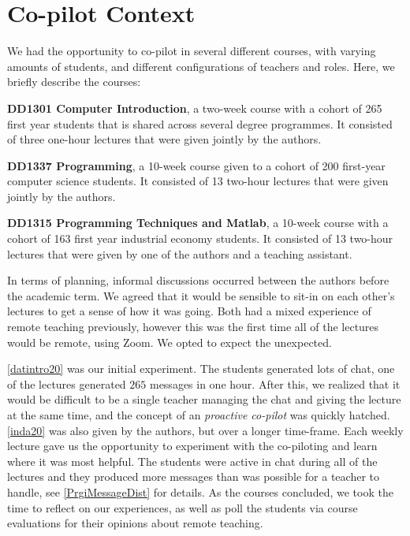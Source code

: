 \documentclass[sigconf,natbib=false]{acmart}
\begin{document}
\section{Co-pilot Context}
We had the opportunity to co-pilot in several different courses, with varying amounts of students, and different configurations of teachers and roles. Here, we briefly describe the courses:

\begin{courses}
  \item\label{datintro20} \textbf{DD1301 Computer Introduction}, a two-week course with a cohort of 265 first year students that is shared across several degree programmes. It consisted of three one-hour lectures that were given jointly by the authors.

  \item\label{inda20} \textbf{DD1337 Programming}, a 10-week course given to a cohort of 200 first-year computer science students. It consisted of 13 two-hour lectures that were given jointly by the authors.

  \item\label{prgi20} \textbf{DD1315 Programming Techniques and Matlab}, a 10-week course with a cohort of 163 first year industrial economy students. It consisted of 13 two-hour lectures that were given by one of the authors and a teaching assistant.
\end{courses}

In terms of planning, informal discussions occurred between the authors before the academic term. We agreed that it would be sensible to sit-in on each other's lectures to get a sense of how it was going. Both had a mixed experience of remote teaching previously, however this was the first time all of the  lectures would be remote, using Zoom. We opted to expect the unexpected.

\ref{datintro20} was our initial experiment. The students generated lots of chat, \eg one of the lectures generated $265$ messages in one hour. After this, we realized that it would be difficult to be a single teacher managing the chat and giving the lecture at the same time, and the concept of an \emph{proactive co-pilot} was quickly hatched. \ref{inda20} was also given by the authors, but over a longer time-frame. Each weekly lecture gave us the opportunity to experiment with the co-piloting and learn where it was most helpful. The students were active in chat during all of the lectures and they produced more messages than was possible for a teacher to handle, see \cref{PrgiMessageDist} for details. As the courses concluded, we took the time to reflect on our experiences, as well as poll the students via course evaluations for their opinions about remote teaching.
\end{document}
